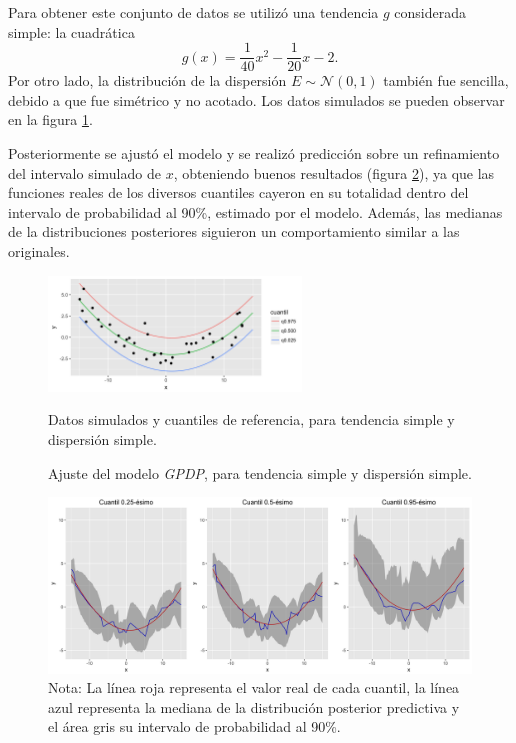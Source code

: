Para obtener este conjunto de datos se utiliz\'o una tendencia $g$ considerada simple: la cuadr\'atica
\begin{equation*}
    g(x) = \frac{1}{40}x^2 - \frac{1}{20}x - 2.
\end{equation*}
Por otro lado, la distribuci\'on de la dispersi\'on $E \sim \mathcal{N}(0,1)$ tambi\'en fue sencilla, debido a que fue sim\'etrico y no acotado. Los datos simulados se pueden observar en la figura \ref{sample_sgse}.

Posteriormente se ajust\'o el modelo y se realiz\'o predicci\'on sobre un refinamiento del intervalo simulado de $x$, obteniendo buenos resultados (figura \ref{fitted_sgse}), ya que las funciones reales de los diversos cuantiles cayeron en su totalidad dentro del intervalo de probabilidad al 90\%, estimado por el modelo. Adem\'as, las medianas de la distribuciones posteriores siguieron un comportamiento similar a las originales.

\begin{figure}[H]
	\centering
	\caption{Datos simulados y cuantiles de referencia, para tendencia simple y dispersi\'on simple.}
	\includegraphics[width=0.60\textwidth]{Figures/Simulation/simple_g_simple_error/sample.png}
	\label{sample_sgse}
\end{figure}

\begin{figure}[H]
	\centering
	\caption{Ajuste del modelo \textit{GPDP}, para tendencia simple y dispersi\'on simple.}
	\includegraphics[width=\textwidth]{Figures/Simulation/simple_g_simple_error/fitted_models.png}
	\captionsetup{singlelinecheck=off,font=footnotesize}
    \caption*{Nota: La l\'inea roja representa el valor real de cada cuantil, la l\'inea azul representa la mediana de la distribuci\'on posterior predictiva y el \'area gris su intervalo de probabilidad al 90\%.}
	\label{fitted_sgse}
\end{figure}

